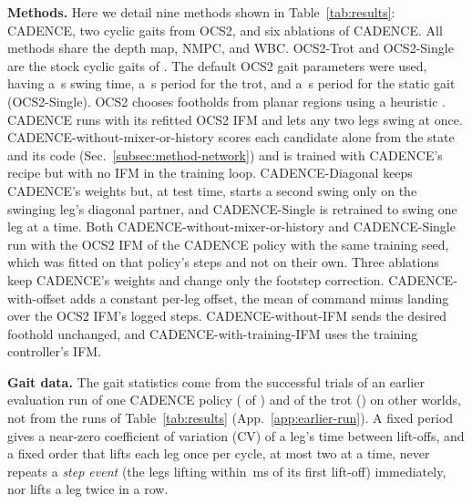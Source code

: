 \noindent\textbf{Methods.}
 Here we detail nine methods shown in Table~\ref{tab:results}: CADENCE, 
two cyclic gaits from OCS2, and six ablations of CADENCE. 
All methods share the depth map, NMPC, and WBC.
OCS2-Trot and OCS2-Single are the stock cyclic gaits
of \citet{leggedperceptive}. The default OCS2 gait parameters were used, having a \corlTrotSwing\,s swing time, a \corlTrotPeriod\,s period for the trot, and
a \corlWalkPeriod\,s period for the static gait (OCS2-Single). OCS2 chooses footholds from planar regions
using a heuristic \citep{grandia_perceptive_2022}.
CADENCE runs with its refitted OCS2 IFM and lets any two legs
swing at once. CADENCE-without-mixer-or-history scores each candidate
alone from the state and its code (Sec.~\ref{subsec:method-network})
and is trained with CADENCE's recipe but with no IFM in the training
loop. CADENCE-Diagonal keeps CADENCE's weights but, at
test time, starts a second swing only on the swinging leg's diagonal
partner, and CADENCE-Single is retrained to swing one leg at a
time. Both CADENCE-without-mixer-or-history and CADENCE-Single run with the OCS2 IFM
of the CADENCE policy with the same training seed, which was fitted on
that policy's steps and not on their own.
Three ablations keep CADENCE's weights and change only the footstep
correction. CADENCE-with-offset adds a constant per-leg offset, the
mean of command minus landing over the OCS2 IFM's logged steps.
CADENCE-without-IFM sends the desired foothold unchanged,
and CADENCE-with-training-IFM uses the training controller's
IFM.

\noindent\textbf{Gait data.}
 The gait statistics come from the successful trials of an
earlier evaluation run of one CADENCE policy
(\corlGaitTrialsGaitNet{} of \corlBenchTrialsPerArm) and of the trot
(\corlGaitTrialsTrot) on other worlds, not from the runs of
Table~\ref{tab:results} (App.~\ref{app:earlier-run}). A fixed period
gives a near-zero coefficient of variation (CV) of a leg's time between
lift-offs, and a fixed order that lifts each leg once per cycle, at
most two at a time, never repeats a \emph{step event} (the legs lifting
within \corlGaitEventWindowMs\,ms of its first lift-off) immediately,
nor lifts a leg twice in a row.

